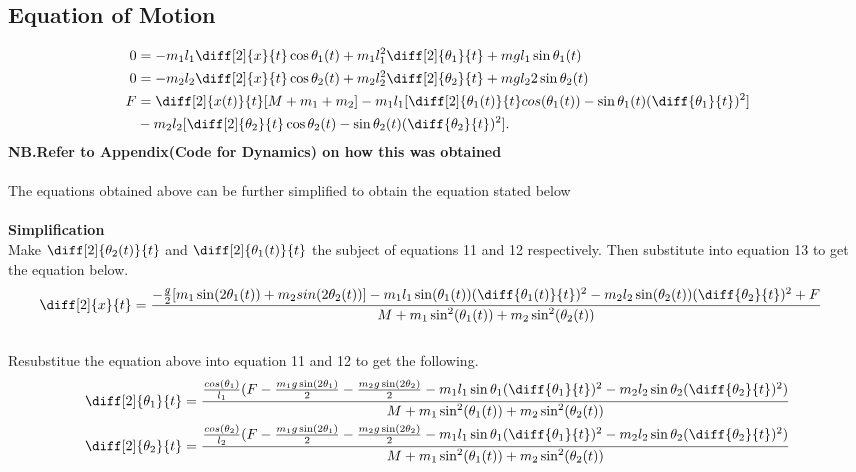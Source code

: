 \documentclass[12pt]{article}
\begin{document}
\subsection{Equation of Motion}
\begin{align}
  0&=-m_1l_1\diff[2]{x}{t}\cos \theta _1(t) + m_1l_1^2\diff[2]{\theta _1}{t} + mgl_1\sin \theta _1(t)\\
  0&=-m_2l_2\diff[2]{x}{t}\cos \theta _2(t) + m_2l_2^2\diff[2]{\theta _2}{t} + mgl_22\sin\theta _2(t) \\
  F&= \diff[2]{x(t)}{t}[M+m_1+m_2] -m_1l_1[\diff[2]{\theta _1(t)}{t}cos(\theta _1(t))-\sin \theta _1(t)(\diff{\theta _1}{t})^2]  \nonumber \\
   &-m_2l_2[\diff[2]{\theta _2}{t}\cos \theta _2(t) - \sin \theta_ 2(t) (\diff{\theta _2}{t})^2].
\end{align}
\textbf{NB.Refer to Appendix(Code for Dynamics) on how this was obtained} \\ \\
The equations obtained above can be further simplified to obtain the equation stated below \\ \\
\textbf{Simplification}\\
Make $\diff[2]{\theta_2(t)}{t}$ and $\diff[2]{\theta_1(t)}{t}$ the subject of equations 11 and 12 respectively. Then substitute into equation 13 to get the equation below. \\
\begin{align} 
  \diff[2]{x}{t} &= \frac{-\frac{g}{2}[m_1\sin(2\theta_1(t))+m_2sin(2\theta_2(t))]-m_1l_1\sin(\theta_1(t))(\diff{\theta_1(t)}{t})^2 - m_2l_2\sin(\theta_2(t))(\diff{\theta_2}{t})^2 + F}{M+m_1\sin^2(\theta_1(t)) +m_2\sin^2(\theta_2(t))} 
\end{align} \\
Resubstitue the equation above into equation 11 and 12 to get the following.
\begin{align}
  \diff[2]{\theta_1}{t} &= \frac{\frac{cos(\theta_1)}{l_1}(F-\frac{m_1g\sin(2\theta_1)}{2}-\frac{m_2g\sin(2\theta_2)}{2}-m_1l_1\sin\theta_1(\diff{\theta_1}{t})^2-m_2l_2\sin\theta_2(\diff{\theta_2}{t})^2)}
                           {M+m_1\sin^2(\theta_1(t)) +m_2\sin^2(\theta_2(t))} \\
  \diff[2]{\theta_2}{t} &= \frac{\frac{cos(\theta_2)}{l_2}(F-\frac{m_1g\sin(2\theta_1)}{2}-\frac{m_2g\sin(2\theta_2)}{2}-m_1l_1\sin\theta_1(\diff{\theta_1}{t})^2-m_2l_2\sin\theta_2(\diff{\theta_2}{t})^2)}
                           {M+m_1\sin^2(\theta_1(t)) +m_2\sin^2(\theta_2(t))} 
\end{align}
\end{document}
